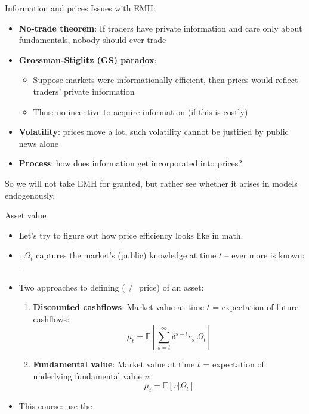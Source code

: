 \documentclass[english,10pt
,aspectratio=169
]{beamer}
\begin{document}
\begin{frame}{Information and prices}
Issues with EMH:
\begin{itemize}
	\item \textbf{No-trade theorem}: If traders have private information and care only about fundamentals, nobody should ever trade
	\item \textbf{Grossman-Stiglitz (GS) paradox}: 
	\begin{itemize}
		\item Suppose markets were informationally efficient, then prices would reflect traders' private information
		\item Thus: no incentive to acquire information (if this is costly)
	\end{itemize} 
	\item \textbf{Volatility}: prices move a lot, such volatility cannot be justified by public news alone
	\item \textbf{Process}: \alert{how} does information get incorporated into prices?
\end{itemize}
So we will not take EMH for granted, but rather see whether it arises in models endogenously.
\end{frame}


\begin{frame}{Asset value}
	\begin{itemize}
		\item Let's try to figure out how price efficiency looks like in math.
		\item {}: $\Omega_t$ captures the market's (public) knowledge at time $t$ -- ever more is known: 
		. 
		\item Two approaches to defining  ($\neq$ price) of an asset:
		\begin{enumerate}
			\item \textbf{Discounted cashflows}: Market value at time $t$  = expectation of future cashflows:
			\[
			\mu_t = \mathbb{E}\left[\sum_{s=t}^{\infty} \delta^{s-t} c_s | \Omega_t \right]
			\]
			\item \textbf{Fundamental value}: Market value at time $t$ = expectation of underlying fundamental value $v$:
			\[
			\mu_t = \mathbb{E} \left[ v | \Omega_t \right]
			\]
		\end{enumerate}
		\item This course: use the 
	\end{itemize}
\end{frame}
\end{document}
